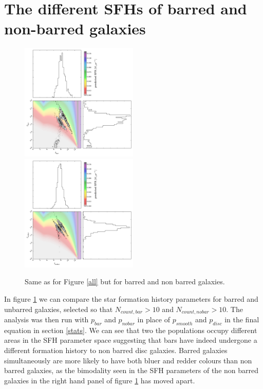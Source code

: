 \documentclass{mn2e}
\begin{document}
\appendix
\section{The different SFHs of barred and non-barred galaxies}

\begin{figure}
\includegraphics[width=0.4975\textwidth]{bars.pdf}
\includegraphics[width=0.4975\textwidth]{no_bars.pdf}
\caption{Same as for Figure \ref{all} but for barred and non barred galaxies.}
\label{bars}
\end{figure}

In figure \ref{bars} we can compare the star formation history parameters for barred and unbarred galaxies, selected so that $N_{count, bar} > 10$ and $N_{count, no bar} > 10$. The analysis was then run with $p_{bar}$ and $p_{no bar}$ in place of $p_{smooth}$ and $p_{disc}$ in the final equation in section \ref{stats}. We can see that two the populations occupy different areas in the SFH parameter space suggesting that bars have indeed undergone a different formation history to non barred disc galaxies.  Barred galaxies simultaneously are more likely to have both bluer and redder colours than non barred galaxies, as the bimodality seen in the SFH parameters of the non barred galaxies in the right hand panel of figure \ref{bars} has moved apart. 
\end{document}
